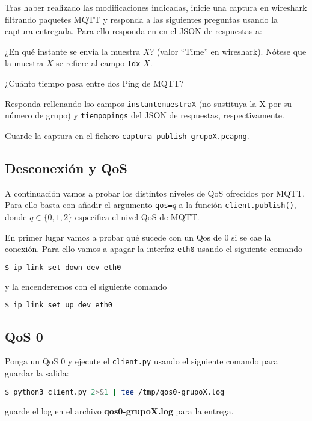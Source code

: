 \documentclass{upmassignment}
\begin{document}
Tras haber realizado las modificaciones
indicadas, inicie una captura en
wireshark filtrando paquetes MQTT y
responda a las siguientes
preguntas usando la captura entregada.
Para ello responda en
en el JSON de respuestas a:


\begin{problemlist}
    \pbitem ¿En qué instante
        se envía la muestra $X$?
        (valor ``Time'' en wireshark).
        Nótese que la muestra $X$
        se refiere al campo \texttt{Idx}
        $X$.

    \pbitem ¿Cuánto tiempo
        pasa entre dos 
        Ping de MQTT?
\end{problemlist}
Responda rellenando lso campos
\texttt{instantemuestraX} (no sustituya
la X por su número de grupo) y
\texttt{tiempopings} del JSON
de respuestas, respectivamente.

Guarde la captura en el fichero
\texttt{captura-publish-grupoX.pcapng}.


\subsection*{Desconexión y QoS}
\noindent A continuación vamos a probar
los distintos niveles de QoS ofrecidos
por MQTT. Para ello basta con
añadir el argumento
\texttt{qos=$q$} a la función
\texttt{client.publish()}, donde
$q\in\{0,1,2\}$ especifica el nivel
QoS de MQTT.

En primer lugar vamos a probar
qué sucede con un Qos de 0 si se
cae la conexión. Para ello vamos a
apagar la interfaz
\texttt{eth0} usando el
siguiente comando
\begin{lstlisting}[language=bash]
$ ip link set down dev eth0
\end{lstlisting}
y la encenderemos con el siguiente comando
\begin{lstlisting}[language=bash]
$ ip link set up dev eth0
\end{lstlisting}



\subsection*{QoS 0}
\noindent
Ponga un QoS 0 y ejecute el
\texttt{client.py} usando el
siguiente comando para guardar la salida:
\begin{lstlisting}[language=bash]
$ python3 client.py 2>&1 | tee /tmp/qos0-grupoX.log
\end{lstlisting}
guarde el log en el archivo \textbf{qos0-grupoX.log}
para la entrega.
\end{document}
